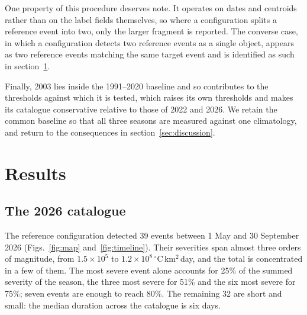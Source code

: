 \documentclass{amsdraft}
\begin{document}
One property of this procedure deserves note. It operates on dates and
centroids rather than on the label fields themselves, so where a configuration
splits a reference event into two, only the larger fragment is reported. The
converse case, in which a configuration detects two reference events as a
single object, appears as two reference events matching the same target event
and is identified as such in section~\ref{sec:results}.

Finally, 2003 lies inside the 1991--2020 baseline and so contributes to the
thresholds against which it is tested, which raises its own thresholds and
makes its catalogue conservative relative to those of 2022 and 2026. We
retain the common baseline so that all three seasons are measured against one
climatology, and return to the consequences in section~\ref{sec:discussion}.

\section{Results}
\label{sec:results}


\subsection{The 2026 catalogue}
\label{sec:cat2026}

The reference configuration detected 39 events between 1 May and 30
September 2026 (Figs.~\ref{fig:map} and~\ref{fig:timeline}). Their
severities span almost three orders of magnitude, from
$1.5\times10^{5}$ to $1.2\times10^{8}$\,$^\circ$C\,km$^2$\,day, and the
total is concentrated in a few of them. The most severe event alone
accounts for 25\% of the summed severity of the season, the three most
severe for 51\% and the six most severe for 75\%; seven events are enough
to reach 80\%. The remaining 32 are short and small: the median duration
across the catalogue is six days.
\end{document}
